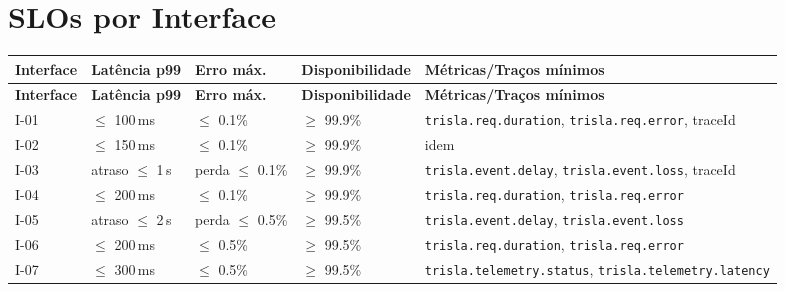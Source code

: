 \section{SLOs por Interface}
{\scriptsize
\setlength{\tabcolsep}{3pt}
\begin{longtable}{L{1.6cm} L{2.4cm} L{2.2cm} L{2.8cm} L{4.0cm}}
\toprule
\textbf{Interface} & \textbf{Latência p99} & \textbf{Erro máx.} & \textbf{Disponibilidade} & \textbf{Métricas/Traços mínimos} \\
\midrule
\endfirsthead
\toprule
\textbf{Interface} & \textbf{Latência p99} & \textbf{Erro máx.} & \textbf{Disponibilidade} & \textbf{Métricas/Traços mínimos} \\
\midrule
\endhead
I-01 & $\leq$ 100\,ms & $\leq$ 0.1\% & $\geq$ 99.9\% & \texttt{trisla.req.duration}, \texttt{trisla.req.error}, traceId \\
I-02 & $\leq$ 150\,ms & $\leq$ 0.1\% & $\geq$ 99.9\% & idem \\
I-03 & atraso $\leq$ 1\,s & perda $\leq$ 0.1\% & $\geq$ 99.9\% & \texttt{trisla.event.delay}, \texttt{trisla.event.loss}, traceId \\
I-04 & $\leq$ 200\,ms & $\leq$ 0.1\% & $\geq$ 99.9\% & \texttt{trisla.req.duration}, \texttt{trisla.req.error} \\
I-05 & atraso $\leq$ 2\,s & perda $\leq$ 0.5\% & $\geq$ 99.5\% & \texttt{trisla.event.delay}, \texttt{trisla.event.loss} \\
I-06 & $\leq$ 200\,ms & $\leq$ 0.5\% & $\geq$ 99.5\% & \texttt{trisla.req.duration}, \texttt{trisla.req.error} \\
I-07 & $\leq$ 300\,ms & $\leq$ 0.5\% & $\geq$ 99.5\% & \texttt{trisla.telemetry.status}, \texttt{trisla.telemetry.latency} \\
\bottomrule
\end{longtable}
}

